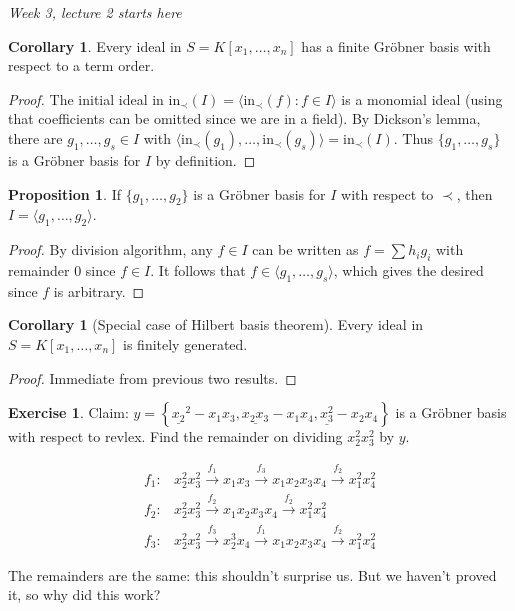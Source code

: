 \documentclass[a4paper]{article}
\newcommand{\In}{\text{in}}
\theoremstyle{definition}
\newtheorem{prop}[defn]{Proposition}
\newtheorem{coro}[defn]{Corollary}
\newtheorem{exe}[defn]{Exercise}
\begin{document}
\begin{flushright}
\textit{Week 3, lecture 2 starts here}
\end{flushright}

\begin{coro}
Every ideal in $S=K[x_1,\ldots,x_n]$ has a finite Gröbner basis with respect to a term order.
\end{coro}
\begin{proof}
The initial ideal in $\In_\prec(I)=\langle \In_\prec(f):f\in I\rangle$ is a monomial ideal (using that coefficients can be omitted since we are in a field). By Dickson's lemma, there are $g_1,\ldots,g_s\in I$ with $\langle \In_\prec(g_1),\ldots,\In_\prec(g_s)\rangle=\In_\prec(I)$. Thus $\{g_1,\ldots,g_s\}$ is a Gröbner basis for $I$ by definition.
\end{proof}

\begin{prop}
If $\{g_1,\ldots,g_2\}$ is a Gröbner basis for $I$ with respect to $\prec$, then $I=\langle g_1,\ldots,g_2\rangle$.
\end{prop}
\begin{proof}
By division algorithm, any $f\in I$ can be written as $f=\sum h_i g_i$ with remainder 0 since $f\in I$. It follows that $f\in\langle g_1,\ldots,g_s\rangle$, which gives the desired since $f$ is arbitrary.
\end{proof}

\begin{coro}[Special case of Hilbert basis theorem]
Every ideal in $S=K[x_1,\ldots,x_n]$ is finitely generated.
\end{coro}
\begin{proof}
Immediate from previous two results.
\end{proof}
\begin{exe}
Claim: $y=\left\{\underline{x_2}^2-x_1x_3,\underline{x_2x_3}-x_1x_4,\underline{x_3^2}-x_2x_4\right\}$ is a Gröbner basis with respect to revlex. Find the remainder on dividing $x_2^2x_3^2$ by $y$.

\[
\begin{aligned}
f_1:& x_2^2x_3^2 \xrightarrow{f_1} x_1x_3\xrightarrow{f_3}x_1x_2x_3x_4\xrightarrow{f_2}x_1^2x_4^2 \\
f_2:& x_2^2x_3^2 \xrightarrow{f_2} x_1x_2x_3x_4\xrightarrow{f_2} x_1^2x_4^2 \\
f_3:& x_2^2x_3^2 \xrightarrow{f_3}x_2^3x_4\xrightarrow{f_1}x_1x_2x_3x_4\xrightarrow{f_2}x_1^2x_4^2
\end{aligned}
\]

The remainders are the same: this shouldn't surprise us. But we haven't proved it, so why did this work?
\end{exe}
\end{document}
